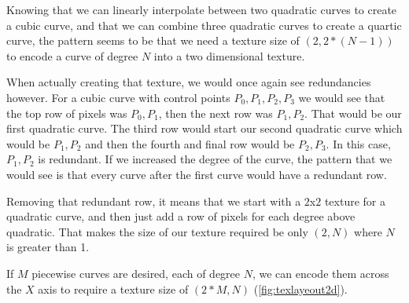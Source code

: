 \documentclass{jcgt}
\begin{document}
Knowing that we can linearly interpolate between two quadratic curves to create a cubic curve, and that we can combine three quadratic curves to create a quartic curve, the pattern seems to be that we need a texture size of $(2,2*(N-1))$ to encode a curve of degree $N$ into a two dimensional texture.

When actually creating that texture, we would once again see redundancies however.  For a cubic curve with control points $P_0,P_1,P_2,P_3$ we would see that the top row of pixels was $P_0,P_1$, then the next row was $P_1,P_2$.  That would be our first quadratic curve.  The third row would start our second quadratic curve which would be $P_1,P_2$ and then the fourth and final row would be $P_2,P_3$.  In this case, $P_1,P_2$ is redundant.  If we increased the degree of the curve, the pattern that we would see is that every curve after the first curve would have a redundant row.

Removing that redundant row, it means that we start with a $2$x$2$ texture for a quadratic curve, and then just add a row of pixels for each degree above quadratic.  That makes the size of our texture required be only $(2,N)$ where $N$ is greater than 1.

If $M$ piecewise curves are desired, each of degree $N$, we can encode them across the $X$ axis to require a texture size of $(2*M,N)$ (\autoref{fig:texlayeout2d}).
\end{document}
